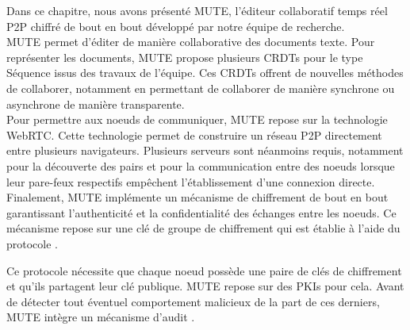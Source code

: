 Dans ce chapitre, nous avons présenté \acf{MUTE}, l'éditeur collaboratif temps réel \ac{P2P} chiffré de bout en bout développé par notre équipe de recherche.\\

MUTE permet d'éditer de manière collaborative des documents texte.
Pour représenter les documents, MUTE propose plusieurs \acp{CRDT} pour le type Séquence \cite{2013-logootsplit,2021-these-vic,2022-rls-tpds-nicolas} issus des travaux de l'équipe.
Ces \acp{CRDT} offrent de nouvelles méthodes de collaborer, notamment en permettant de collaborer de manière synchrone ou asynchrone de manière transparente.\\

Pour permettre aux noeuds de communiquer, MUTE repose sur la technologie WebRTC.
Cette technologie permet de construire un réseau \ac{P2P} directement entre plusieurs navigateurs.
Plusieurs serveurs sont néanmoins requis, notamment pour la découverte des pairs et pour la communication entre des noeuds lorsque leur pare-feux respectifs empêchent l'établissement d'une connexion directe.\\

Finalement, MUTE implémente un mécanisme de chiffrement de bout en bout garantissant l'authenticité et la confidentialité des échanges entre les noeuds.
Ce mécanisme repose sur une clé de groupe de chiffrement qui est établie à l'aide du protocole \cite{1995-burmester-desmedt}.

Ce protocole nécessite que chaque noeud possède une paire de clés de chiffrement et qu'ils partagent leur clé publique.
\ac{MUTE} repose sur des \acp{PKI} pour cela.
Avant de détecter tout éventuel comportement malicieux de la part de ces derniers, \ac{MUTE} intègre un mécanisme d'audit \cite{2018-trusternity-short,2018-trusternity-long}.\\
